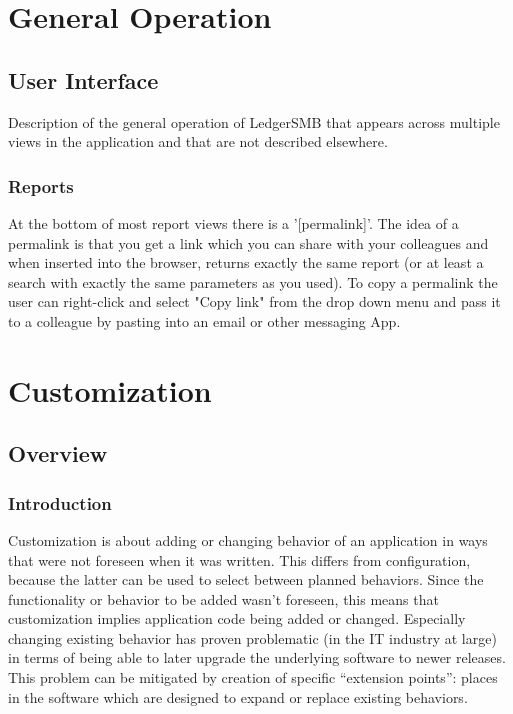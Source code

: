 
\part{General Operation}
\label{part-general-operation}

\chapter{User Interface}
\label{cha-general-operation-user-interfacei}
Description of the general operation of LedgerSMB that appears across multiple views in the application and that are not described elsewhere.

\section{Reports}
\label{sec-general-operation-user-interface-reports}

At the bottom of most report views there is a '[permalink]'. The idea of a \gls{permalink} is that you get a link which you can share with your colleagues and when inserted into the browser, returns exactly the same report (or at least a search with exactly the same parameters as you used).  To copy a  \gls{permalink} the user can right-click and select "Copy link" from the drop down menu and pass it to a colleague by pasting into an email or other messaging App.

\part{Customization}
\label{part-customization}

\chapter{Overview}
\label{cha-customization-overview}

\section{Introduction}
\label{sec-customization-overview-introduction}

Customization is about adding or changing behavior of an application in ways that were not foreseen when it was written.  This differs from configuration, because the latter can be used to select between planned behaviors.  Since the functionality or behavior to be added wasn't foreseen, this means that customization implies application code being added or changed.  Especially changing existing behavior has proven problematic (in the IT industry at large) in terms of being able to later upgrade the underlying software to newer releases.  This problem can be mitigated by creation of specific ``extension points'': places in the software which are designed to expand or replace existing behaviors.

